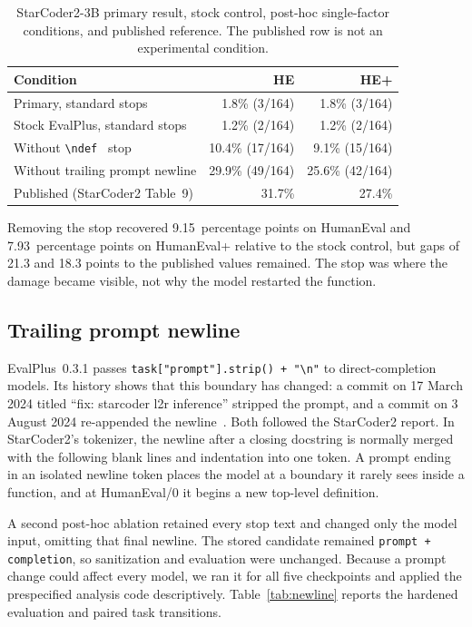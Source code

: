 \documentclass[10pt,twocolumn]{article}
\newcommand{\code}[1]{\texttt{#1}}
\newcommand{\pp}{percentage points}
\begin{document}
\begin{table}[t]
\centering
\caption{StarCoder2-3B primary result, stock control, post-hoc single-factor conditions, and published reference. The published row is not an experimental condition.}
\label{tab:ablation}
\scriptsize
\begin{tabularx}{\columnwidth}{@{}Xrr@{}}
\toprule
Condition & HE & HE+ \\
\midrule
Primary, standard stops & 1.8\% (3/164) & 1.8\% (3/164) \\
Stock EvalPlus, standard stops & 1.2\% (2/164) & 1.2\% (2/164) \\
Without \code{\textbackslash ndef } stop & 10.4\% (17/164) & 9.1\% (15/164) \\
Without trailing prompt newline & 29.9\% (49/164) & 25.6\% (42/164) \\
Published (StarCoder2 Table~9) & 31.7\% & 27.4\% \\
\bottomrule
\end{tabularx}
\end{table}

Removing the stop recovered 9.15~\pp{} on HumanEval and 7.93~\pp{} on HumanEval+ relative to the stock control, but gaps of 21.3 and 18.3 points to the published values remained. The stop was where the damage became visible, not why the model restarted the function.

\subsection{Trailing prompt newline}

EvalPlus~0.3.1 passes \code{task["prompt"].strip() + "\textbackslash n"} to direct-completion models. Its history shows that this boundary has changed: a commit on 17 March 2024 titled ``fix: starcoder l2r inference'' stripped the prompt, and a commit on 3 August 2024 re-appended the newline~\citep{evalplus2026setup}. Both followed the StarCoder2 report. In StarCoder2's tokenizer, the newline after a closing docstring is normally merged with the following blank lines and indentation into one token. A prompt ending in an isolated newline token places the model at a boundary it rarely sees inside a function, and at HumanEval/0 it begins a new top-level definition.

A second post-hoc ablation retained every stop text and changed only the model input, omitting that final newline. The stored candidate remained \code{prompt + completion}, so sanitization and evaluation were unchanged. Because a prompt change could affect every model, we ran it for all five checkpoints and applied the prespecified analysis code descriptively. Table~\ref{tab:newline} reports the hardened evaluation and paired task transitions.
\end{document}
